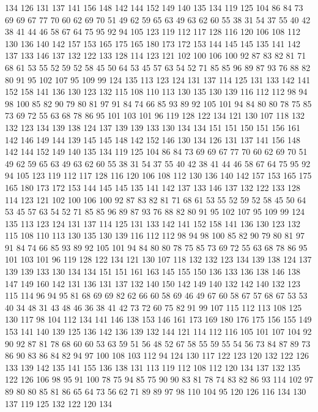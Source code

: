 134 126 131 137 141 156 148 142 144 152 149 140 135 134 119 125 104 86 84 73
69 69 67 77 70 60 62 69 70 51 49 62 59 65 63 49 63 62 60 55
38 31 54 37 55 40 42 38 41 44 46 58 67 64 75 95 92 94 105 123
119 112 117 128 116 120 106 108 112 130 136 140 142 157 153 165 175 165 180 173
172 153 144 145 145 135 141 142 137 133 146 137 132 122 133 128 114 123 121 102
100 106 100 92 87 83 82 81 71 68 61 53 55 52 59 52 58 45 50 64
53 45 57 63 54 52 71 85 85 96 89 87 93 76 88 82 80 91 95 102
107 95 109 99 124 135 113 123 124 131 137 114 125 131 133 142 141 152 158 141
136 130 123 132 115 108 110 113 130 135 130 139 116 112 112 98 94 98 100 85
82 90 79 80 81 97 91 84 74 66 85 93 89 92 105 101 94 84 80 80
78 75 85 73 69 72 55 63 68 78 86 95 101 103 101 96 119 128 122 134
121 130 107 118 132 132 123 134 139 138 124 137 139 139 133 130 134 134 151 151
150 151 156 161 142 146 149 144 139 145 145 148 142 152 146 130 134 126 131 137
141 156 148 142 144 152 149 140 135 134 119 125 104 86 84 73 69 69 67 77
70 60 62 69 70 51 49 62 59 65 63 49 63 62 60 55 38 31 54 37
55 40 42 38 41 44 46 58 67 64 75 95 92 94 105 123 119 112 117 128
116 120 106 108 112 130 136 140 142 157 153 165 175 165 180 173 172 153 144 145
145 135 141 142 137 133 146 137 132 122 133 128 114 123 121 102 100 106 100 92
87 83 82 81 71 68 61 53 55 52 59 52 58 45 50 64 53 45 57 63
54 52 71 85 85 96 89 87 93 76 88 82 80 91 95 102 107 95 109 99
124 135 113 123 124 131 137 114 125 131 133 142 141 152 158 141 136 130 123 132
115 108 110 113 130 135 130 139 116 112 112 98 94 98 100 85 82 90 79 80
81 97 91 84 74 66 85 93 89 92 105 101 94 84 80 80 78 75 85 73
69 72 55 63 68 78 86 95 101 103 101 96 119 128 122 134 121 130 107 118
132 132 123 134 139 138 124 137 139 139 133 130 134 134 151 151 161 163 145 155
150 136 133 136 138 146 138 147 149 160 142 131 136 131 137 132 140 150 142 149
140 132 142 140 132 123 115 114 96 94 95 81 68 69 69 82 62 66 60 58
69 46 49 67 60 58 67 57 68 67 53 53 40 34 48 31 43 48 46 36
38 41 42 73 72 60 75 82 91 99 107 115 112 113 108 125 130 117 98 104
112 134 141 146 138 153 146 161 173 169 180 176 175 156 155 149 153 141 140 139
125 136 142 136 139 132 144 121 114 112 116 105 101 107 104 92 90 92 87 81
78 68 60 60 53 63 59 51 56 48 52 67 58 55 59 55 54 56 73 84
87 89 73 86 90 83 86 84 82 94 97 100 108 103 112 94 124 130 117 122
123 120 132 122 126 133 139 142 135 141 155 136 138 131 113 119 112 108 112 120
134 137 132 135 122 126 106 98 95 91 100 78 75 94 85 75 90 90 83 81
78 74 83 82 86 93 114 102 97 89 80 80 85 81 86 65 64 73 56 62
71 89 89 97 98 110 104 95 120 126 116 134 130 137 119 125 132 122 120 134
